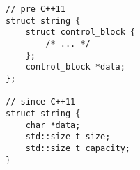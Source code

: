 \begin{lstlisting}[title=\href{https://godbolt.org/z/TPeGa6}{\texttt{godbolt.org/z/TPeGa6}}]
// pre C++11
struct string {
    struct control_block {
        /* ... */
    };
    control_block *data;
};

// since C++11
struct string {
    char *data;
    std::size_t size;
    std::size_t capacity;
}
\end{lstlisting}
